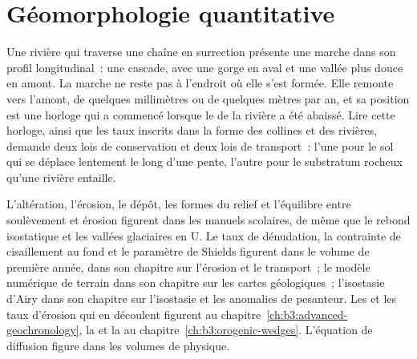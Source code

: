 \chapter{Géomorphologie quantitative}\label{ch:b3:quantitative-geomorphology}

Une rivière qui traverse une chaîne en surrection présente une marche dans son profil longitudinal~: une cascade,
avec une gorge en aval et une vallée plus douce en amont. La marche ne reste pas
à l'endroit où elle s'est formée. Elle remonte vers l'amont, de quelques millimètres ou de quelques mètres
par an, et sa position est une horloge qui a commencé lorsque le  de la rivière a été
abaissé. Lire cette horloge, ainsi que les taux inscrits dans la forme des collines
et des rivières, demande deux lois de conservation et deux lois de transport~: l'une pour le
sol qui se déplace lentement le long d'une pente, l'autre pour le substratum rocheux qu'une rivière entaille.

\begin{recall}
L'altération, l'érosion, le dépôt, les formes du relief et l'équilibre entre
soulèvement et érosion figurent dans les manuels scolaires, de même que le rebond isostatique et les
vallées glaciaires en U. Le taux de dénudation, la contrainte de cisaillement au fond et le
paramètre de Shields figurent dans le volume de première année, dans son chapitre sur l'érosion et le transport~;
le modèle numérique de terrain dans son chapitre sur les cartes géologiques~; l'isostasie d'Airy
dans son chapitre sur l'isostasie et les anomalies de pesanteur. Les 
et les taux d'érosion qui en découlent figurent
au chapitre~\ref{ch:b3:advanced-geochronology}, la  et la
 au chapitre~\ref{ch:b3:orogenic-wedges}.
L'équation de diffusion figure dans les volumes de physique.
\end{recall}

